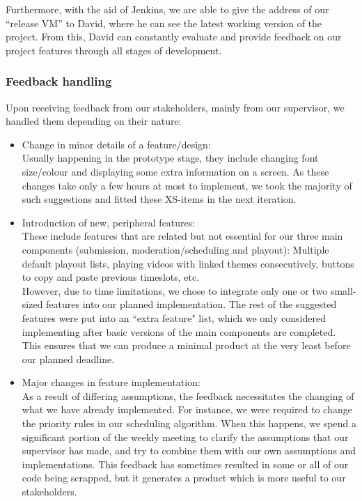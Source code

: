 \documentclass[a4paper, titlepage]{article}
\begin{document}
Furthermore, with the aid of Jenkins, we are able to give the address of our ``release VM'' to David, where he can see the latest working version of the project. From this, David can constantly evaluate and provide feedback on our project features through all stages of development.

\subsubsection{Feedback handling}

Upon receiving feedback from our stakeholders, mainly from our supervisor, we handled them depending on their nature:

\begin{itemize}

  \item Change in minor details of a feature/design: \\
        Usually happening in the prototype stage, they include changing font size/colour and displaying some extra information on a screen. As these changes take only a few hours at most to implement, we took the majority of such suggestions and fitted these XS-items in the next iteration.

  \item Introduction of new, peripheral features: \\
        These include features that are related but not essential for our three main components (submission, moderation/scheduling and playout): Multiple default playout lists, playing videos with linked themes consecutively, buttons to copy and paste previous timeslots, etc. \\
        However, due to time limitations, we chose to integrate only one or two small-sized features into our planned implementation. The rest of the suggested features were put into an ``extra feature" list, which we only considered implementing after basic versions of the main components are completed. This ensures that we can produce a minimal product at the very least before our planned deadline.

  \item Major changes in feature implementation: \\
        As a result of differing assumptions, the feedback necessitates the changing of what we have already implemented. For instance, we were required to change the priority rules in our scheduling algorithm. When this happens, we spend a significant portion of the weekly meeting to clarify the assumptions that our supervisor has made, and try to combine them with our own assumptions and implementations. This feedback has sometimes resulted in some or all of our code being scrapped, but it generates a product which is more useful to our stakeholders.

\end{itemize}
\end{document}
